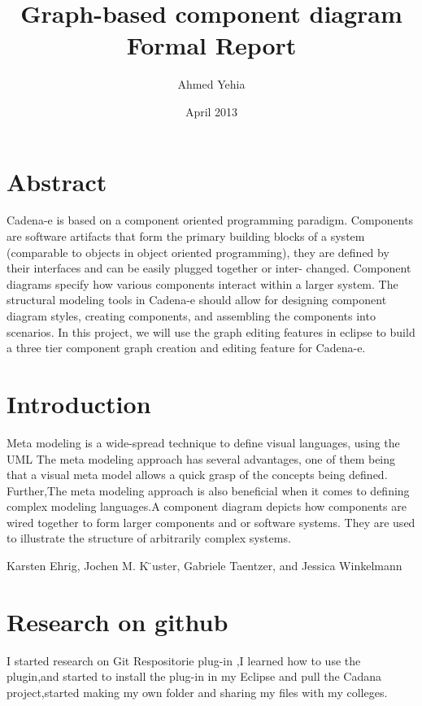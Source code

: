 \documentclass{article}
\title{Graph-based component diagram\\ {\smaller Formal Report}}
\author{Ahmed Yehia}
\date{April 2013}
\begin{document}
\maketitle


\section{Abstract}
Cadena-e is based on a component oriented programming paradigm.
Components are software artifacts that form the primary building blocks
of a system (comparable to objects in object oriented programming), they
are defined by their interfaces and can be easily plugged together or inter-
changed. Component diagrams specify how various components interact
within a larger system. The structural modeling tools in Cadena-e should
allow for designing component diagram styles, creating components, and
assembling the components into scenarios.
In this project, we will use the graph editing features in eclipse to build
a three tier component graph creation and editing feature for Cadena-e.



\section{Introduction}
Meta modeling is a wide-spread technique to define visual languages, using the UML The meta modeling approach has several advantages, one of them being that a visual meta model allows a quick grasp of the concepts being defined. Further,The meta modeling approach is also beneficial when it comes to defining complex modeling languages.A component diagram depicts how components are wired together to form larger components and or software systems. They are used to illustrate the structure of arbitrarily complex systems.

{Karsten Ehrig, Jochen M. K ̈uster, Gabriele Taentzer, and Jessica Winkelmann}



\section{Research on github}

I started research on Git Respositorie plug-in ,I learned how to use the plugin,and started to install the plug-in in my Eclipse and pull the Cadana project,started making my own folder and sharing my files with my colleges. 
\end{document}
